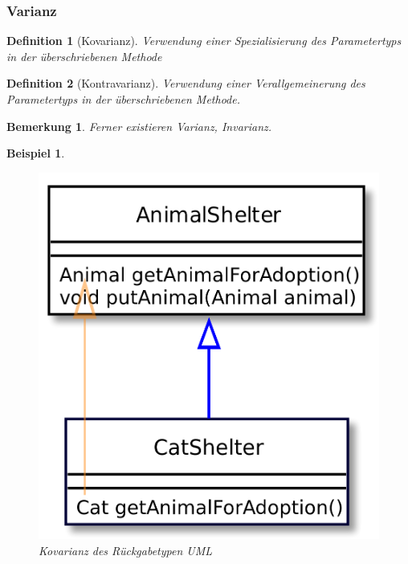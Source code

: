 \documentclass[a4paper]{article}
\theoremstyle{break}
\newtheorem{defi}{Definition}[section]
\newtheorem{ann}{Bemerkung}[section]
\newtheorem{ex}{Beispiel}[section]
\begin{document}
\subsubsection{Varianz}
\begin{defi}[Kovarianz]
	Verwendung einer Spezialisierung des Parametertyps in der überschriebenen Methode
\end{defi}

\begin{defi}[Kontravarianz]
	Verwendung einer Verallgemeinerung des Parametertyps in der überschriebenen Methode.
\end{defi}

\begin{ann}
	Ferner existieren Varianz, Invarianz.
\end{ann}

\begin{ex}
	\begin{figure}[H]
		\centering
		\includegraphics[width=\textwidth]{../diagrams/uml/covariance.png}
		\caption{Kovarianz des Rückgabetypen UML}
	\end{figure}
\end{ex}
\end{document}
